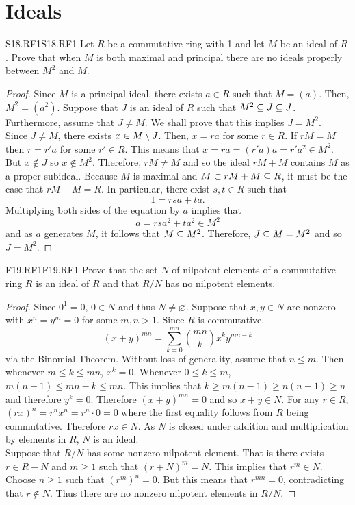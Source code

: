 \documentclass[../AlgebraQualSolutions.tex]{subfiles}
\begin{document}
\section{Ideals}

	\begin{prob}{S18.RF1}{S18.RF1}
		Let $R$ be a commutative ring with 1 and let $M$ be an ideal of $R$. Prove that when $M$ is both maximal and principal there are no ideals properly between $M^2$ and $M$.
	\end{prob}

	\begin{proof}
		Since $M$ is a principal ideal, there exists $a \in R$ such that $M = (a)$. Then, $M^2 = (a^2)$. Suppose that $J$ is an ideal of $R$ such that $M^2 \subseteq J \subseteq J$. Furthermore, assume that $J \neq M$. We shall prove that this implies $J = M^2$.\\

		Since $J \neq M$, there exists $x \in M \setminus J$. Then, $x = ra$ for some $r \in R$. If $rM = M$ then $r = r'a$ for some $r' \in R$. This means that $x = ra = (r'a)a = r'a^2 \in M^2$. But $x \not\in J$ so $x \not\in M^2$. Therefore, $rM \neq M$ and so the ideal $rM + M$ contains $M$ as a proper subideal. Because $M$ is maximal and $M \subset rM + M \subseteq R$, it must be the case that $rM + M = R$. In particular, there exist $s,t \in R$ such that
			\[1 = rsa + ta.\]
		Multiplying both sides of the equation by $a$ implies that
			\[a = rsa^2 + ta^2 \in M^2\]
		and as $a$ generates $M$, it follows that $M \subseteq M^2$. Therefore, $J \subseteq M = M^2$ and so $J = M^2$.
	\end{proof}

	\begin{prob}{F19.RF1}{F19.RF1}
	Prove that the set $N$ of nilpotent elements of a commutative ring $R$ is an ideal of $R$ and that $R/N$ has no nilpotent elements.
	\end{prob}
	
	\begin{proof}
	Since $0^1 = 0$, $0 \in N$ and thus $N \neq \varnothing$. Suppose that $x,y \in N$ are nonzero with $x^n = y^m = 0$ for some $m,n > 1$. Since $R$ is commutative,
		\[(x+y)^{mn} = \sum_{k=0}^{mn} {mn \choose k} x^k y^{mn - k} \]
	via the Binomial Theorem. Without loss of generality, assume that $n \leq m$. Then whenever $m \leq k \leq mn$, $x^k = 0$. Whenever $0 \leq k \leq m$, $m(n - 1) \leq mn - k \leq mn$. This implies that $k \geq m(n-1) \geq n(n-1) \geq n$ and therefore $y^k = 0$. Therefore $(x+y)^{mn} = 0$ and so $x + y \in N$. For any $r \in R$, $(rx)^n = r^nx^n = r^n \cdot 0 = 0$ where the first equality follows from $R$ being commutative. Therefore $rx \in N$. As $N$ is closed under addition and multiplication by elements in $R$, $N$ is an ideal.\\
	
	Suppose that $R/N$ has some nonzero nilpotent element. That is there exists $r \in R - N$ and $m \geq 1$ such that $(r+N)^m = N$. This implies that $r^m \in N$. Choose $n \geq 1$  such that $(r^m)^n = 0$. But this means that $r^{mn} = 0$, contradicting that $r \not\in N$. Thus there are no nonzero nilpotent elements in $R/N$.
	\end{proof}
\end{document}

